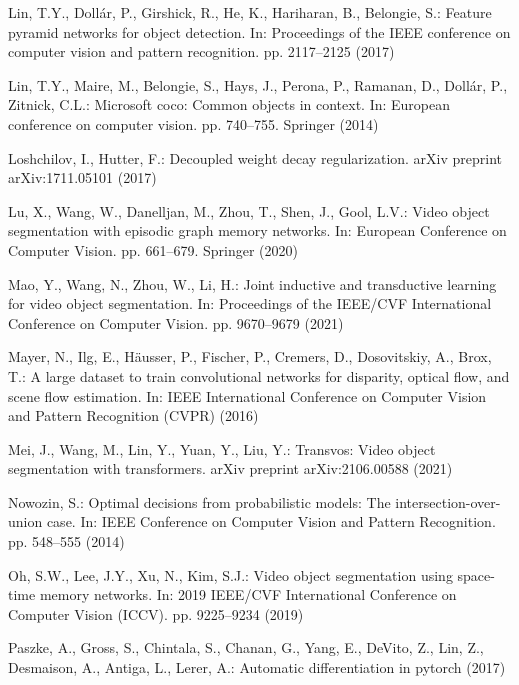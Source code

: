 \documentclass[runningheads]{llncs}
\begin{document}
\begin{thebibliography}{10}
Lin, T.Y., Doll{\'a}r, P., Girshick, R., He, K., Hariharan, B., Belongie, S.:
  Feature pyramid networks for object detection. In: Proceedings of the IEEE
  conference on computer vision and pattern recognition. pp. 2117--2125 (2017)

Lin, T.Y., Maire, M., Belongie, S., Hays, J., Perona, P., Ramanan, D.,
  Doll{\'a}r, P., Zitnick, C.L.: Microsoft coco: Common objects in context. In:
  European conference on computer vision. pp. 740--755. Springer (2014)

Loshchilov, I., Hutter, F.: Decoupled weight decay regularization. arXiv
  preprint arXiv:1711.05101  (2017)

Lu, X., Wang, W., Danelljan, M., Zhou, T., Shen, J., Gool, L.V.: Video object
  segmentation with episodic graph memory networks. In: European Conference on
  Computer Vision. pp. 661--679. Springer (2020)

Mao, Y., Wang, N., Zhou, W., Li, H.: Joint inductive and transductive learning
  for video object segmentation. In: Proceedings of the IEEE/CVF International
  Conference on Computer Vision. pp. 9670--9679 (2021)

Mayer, N., Ilg, E., H{\"a}usser, P., Fischer, P., Cremers, D., Dosovitskiy, A.,
  Brox, T.: A large dataset to train convolutional networks for disparity,
  optical flow, and scene flow estimation. In: IEEE International Conference on
  Computer Vision and Pattern Recognition (CVPR) (2016)

Mei, J., Wang, M., Lin, Y., Yuan, Y., Liu, Y.: Transvos: Video object
  segmentation with transformers. arXiv preprint arXiv:2106.00588  (2021)

Nowozin, S.: Optimal decisions from probabilistic models: The
  intersection-over-union case. In: IEEE Conference on Computer Vision and
  Pattern Recognition. pp. 548--555 (2014)

Oh, S.W., Lee, J.Y., Xu, N., Kim, S.J.: Video object segmentation using
  space-time memory networks. In: 2019 IEEE/CVF International Conference on
  Computer Vision (ICCV). pp. 9225--9234 (2019)

Paszke, A., Gross, S., Chintala, S., Chanan, G., Yang, E., DeVito, Z., Lin, Z.,
  Desmaison, A., Antiga, L., Lerer, A.: Automatic differentiation in pytorch
  (2017)


\end{thebibliography}
\end{document}

